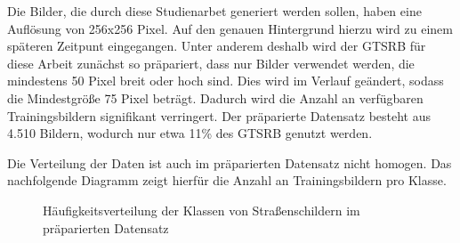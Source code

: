 Die Bilder, die durch diese Studienarbet generiert werden sollen, haben eine Auflösung von 256x256 Pixel. Auf den genauen Hintergrund hierzu wird zu einem späteren Zeitpunt eingegangen. Unter anderem deshalb wird der \ac{GTSRB} für diese Arbeit zunächst so präpariert, dass nur Bilder verwendet werden, die mindestens 50 Pixel breit oder hoch sind. Dies wird im Verlauf geändert, sodass die Mindestgröße 75 Pixel beträgt. Dadurch wird die Anzahl an verfügbaren Trainingsbildern signifikant verringert. Der präparierte Datensatz besteht aus 4.510 Bildern, wodurch nur etwa 11\% des \ac{GTSRB} genutzt werden.

Die Verteilung der Daten ist auch im präparierten Datensatz nicht homogen. Das nachfolgende Diagramm zeigt hierfür die Anzahl an Trainingsbildern pro Klasse.


\begin{figure}[H]
\centering
{}
\caption{Häufigkeitsverteilung der Klassen von Straßenschildern im präparierten Datensatz}
\end{figure}


